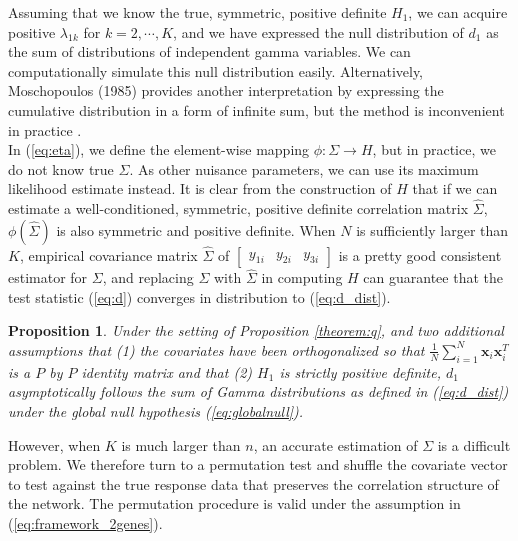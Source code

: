 \documentclass[aoas,preprint]{imsart}
\numberwithin{equation}{section}
\theoremstyle{plain}
\newtheorem{prop}{Proposition}
\begin{document}
Assuming that we know the true, symmetric, positive definite $H_1$, we can acquire positive $\lambda_{1k}$ for $k = 2, \cdots, K$, and we have expressed the null distribution of $d_1$ as the sum of distributions of independent gamma variables. We can computationally simulate this null distribution easily. Alternatively, Moschopoulos (1985) provides another interpretation by expressing the cumulative distribution in a form of infinite sum, but the method is inconvenient in practice \cite{moschopoulos1985distribution}.\\

In (\ref{eq:eta}), we define the element-wise mapping $\phi: \Sigma \rightarrow H$, but in practice, we do not know true $\Sigma$. As other nuisance parameters, we can use its maximum likelihood estimate instead. It is clear from the construction of $H$ that if we can estimate a well-conditioned, symmetric, positive definite correlation matrix $\hat{\Sigma}$, $\phi(\hat{\Sigma})$ is also symmetric and positive definite. When $N$ is sufficiently larger than $K$, empirical covariance matrix $\hat{\Sigma}$ of $\begin{bmatrix} y_{1i} & y_{2i} & y_{3i} \end{bmatrix}$ is a pretty good consistent estimator for $\Sigma$, and replacing $\Sigma$ with $\hat{\Sigma}$ in computing $H$ can guarantee that the test statistic (\ref{eq:d}) converges in distribution to (\ref{eq:d_dist}). 

\begin{prop}
Under the setting of Proposition \ref{theorem:q}, and two additional assumptions that (1) the covariates have been orthogonalized so that 
$\frac{1}{N} \sum_{i=1}^{N} \bm{x}_i \bm{x}_i^T$ is a $P$ by $P$ identity matrix and that (2) $H_1$ is strictly positive definite, $d_1$ asymptotically follows the sum of Gamma distributions as defined in (\ref{eq:d_dist}) under the global null hypothesis (\ref{eq:globalnull}). 
\end{prop}

However, when $K$ is much larger than $n$, an accurate estimation of $\Sigma$ is a difficult problem. We therefore turn to a permutation test and shuffle the covariate vector to test against the true response data that preserves the correlation structure of the network. The permutation procedure is valid under the assumption in (\ref{eq:framework_2genes}). \\
\end{document}
